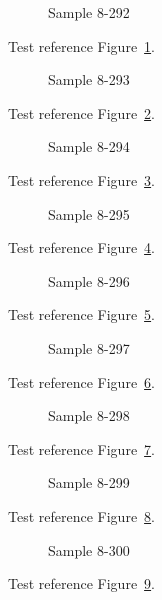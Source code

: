 \begin{figure}[tbhp]
\caption{Sample 8-292}
\label{fig:sample-8-292}
\end{figure}

Test reference Figure~\ref{fig:sample-8-292}.

\begin{figure}[tbhp]
\caption{Sample 8-293}
\label{fig:sample-8-293}
\end{figure}

Test reference Figure~\ref{fig:sample-8-293}.

\begin{figure}[tbhp]
\caption{Sample 8-294}
\label{fig:sample-8-294}
\end{figure}

Test reference Figure~\ref{fig:sample-8-294}.

\begin{figure}[tbhp]
\caption{Sample 8-295}
\label{fig:sample-8-295}
\end{figure}

Test reference Figure~\ref{fig:sample-8-295}.

\begin{figure}[tbhp]
\caption{Sample 8-296}
\label{fig:sample-8-296}
\end{figure}

Test reference Figure~\ref{fig:sample-8-296}.

\begin{figure}[tbhp]
\caption{Sample 8-297}
\label{fig:sample-8-297}
\end{figure}

Test reference Figure~\ref{fig:sample-8-297}.

\begin{figure}[tbhp]
\caption{Sample 8-298}
\label{fig:sample-8-298}
\end{figure}

Test reference Figure~\ref{fig:sample-8-298}.

\begin{figure}[tbhp]
\caption{Sample 8-299}
\label{fig:sample-8-299}
\end{figure}

Test reference Figure~\ref{fig:sample-8-299}.

\begin{figure}[tbhp]
\caption{Sample 8-300}
\label{fig:sample-8-300}
\end{figure}

Test reference Figure~\ref{fig:sample-8-300}.


